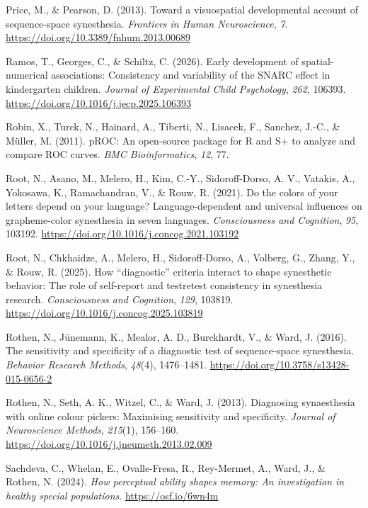 \documentclass[
  man,
  floatsintext,
  longtable,
  nolmodern,
  notxfonts,
  notimes,
  colorlinks=true,linkcolor=blue,citecolor=blue,urlcolor=blue]{apa7}
\newlength{\cslhangindent}
\newenvironment{CSLReferences}[2] %
 {\begin{list}{}{%
  \setlength{\itemindent}{0pt}
  \setlength{\leftmargin}{0pt}
  \setlength{\parsep}{0pt}
  \ifodd #1
   \setlength{\leftmargin}{\cslhangindent}
   \setlength{\itemindent}{-1\cslhangindent}
  \fi
  \setlength{\itemsep}{#2\baselineskip}}}
 {\end{list}}
\begin{document}
\begin{CSLReferences}{1}{0}
Price, M., \& Pearson, D. (2013). Toward a visuospatial developmental
account of sequence-space synesthesia. \emph{Frontiers in Human
Neuroscience}, \emph{7}. \url{https://doi.org/10.3389/fnhum.2013.00689}

Ramos, T., Georges, C., \& Schiltz, C. (2026). Early development of
spatial-numerical associations: Consistency and variability of the SNARC
effect in kindergarten children. \emph{Journal of Experimental Child
Psychology}, \emph{262}, 106393.
\url{https://doi.org/10.1016/j.jecp.2025.106393}

Robin, X., Turck, N., Hainard, A., Tiberti, N., Lisacek, F., Sanchez,
J.-C., \& Müller, M. (2011). {pROC}: An open-source package for {R} and
{S}+ to analyze and compare ROC curves. \emph{BMC Bioinformatics},
\emph{12}, 77.

Root, N., Asano, M., Melero, H., Kim, C.-Y., Sidoroff-Dorso, A. V.,
Vatakis, A., Yokosawa, K., Ramachandran, V., \& Rouw, R. (2021). Do the
colors of your letters depend on your language? Language-dependent and
universal influences on grapheme-color synesthesia in seven languages.
\emph{Consciousness and Cognition}, \emph{95}, 103192.
\url{https://doi.org/10.1016/j.concog.2021.103192}

Root, N., Chkhaidze, A., Melero, H., Sidoroff-Dorso, A., Volberg, G.,
Zhang, Y., \& Rouw, R. (2025). How {``}diagnostic{''} criteria interact
to shape synesthetic behavior: The role of self-report and
test{\textendash}retest consistency in synesthesia research.
\emph{Consciousness and Cognition}, \emph{129}, 103819.
\url{https://doi.org/10.1016/j.concog.2025.103819}

Rothen, N., Jünemann, K., Mealor, A. D., Burckhardt, V., \& Ward, J.
(2016). The sensitivity and specificity of a diagnostic test of
sequence-space synesthesia. \emph{Behavior Research Methods},
\emph{48}(4), 1476--1481.
\url{https://doi.org/10.3758/s13428-015-0656-2}

Rothen, N., Seth, A. K., Witzel, C., \& Ward, J. (2013). Diagnosing
synaesthesia with online colour pickers: Maximising sensitivity and
specificity. \emph{Journal of Neuroscience Methods}, \emph{215}(1),
156--160. \url{https://doi.org/10.1016/j.jneumeth.2013.02.009}

Sachdeva, C., Whelan, E., Ovalle-Fresa, R., Rey-Mermet, A., Ward, J., \&
Rothen, N. (2024). \emph{How perceptual ability shapes memory: An
investigation in healthy special populations}.
\url{https://osf.io/6wn4m}


\end{CSLReferences}
\end{document}
